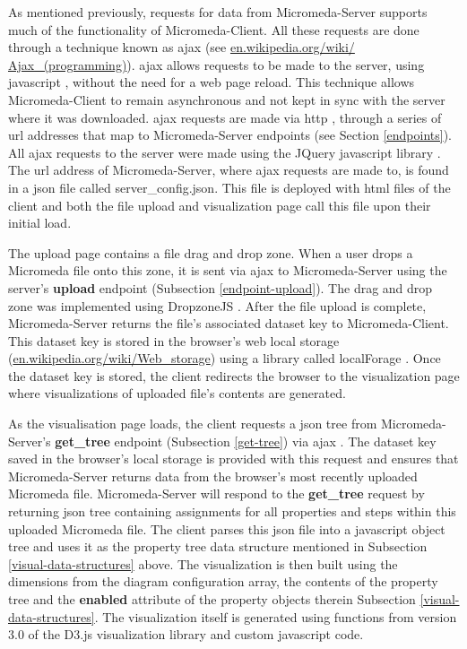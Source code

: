 As mentioned previously, requests for data from Micromeda-Server supports much 
of the functionality of Micromeda-Client. All these requests are done through a 
technique known as \gls{ajax} \cite{garrett2005ajax,li2012jquery} (see 
\href{http://en.wikipedia.org/wiki/Ajax_(programming)}{en.wikipedia.org/wiki/ 
Ajax\_(programming)}). \gls{ajax}  allows requests to be made to the server, 
using \gls{javascript} \cite{flanagan2006javascript}, without the need for a web 
page reload. This technique allows Micromeda-Client to remain asynchronous and 
not kept in sync with the server where it was downloaded. \gls{ajax}  requests 
are made via \gls{http} \cite{fielding1999hypertext}, through a series of 
\gls{url} addresses \cite{berners1994rfc} that map to Micromeda-Server endpoints 
(see Section \ref{endpoints}). All \gls{ajax}  requests to the server were made 
using the JQuery \gls{javascript} library 
\cite{chaffer2013learning,li2012jquery}. The \gls{url} address of 
Micromeda-Server, where \gls{ajax}  requests are made to, is found in a 
\gls{json} file called server\_config.json. This file is deployed with 
\gls{html} files of the client and both the file upload and visualization page 
call this file upon their initial load.

The upload page contains a file drag and drop zone. When a user drops a 
Micromeda file onto this zone, it is sent via \gls{ajax}  to Micromeda-Server 
using the server's \textbf{upload} endpoint (Subsection \ref{endpoint-upload}). 
The drag and drop zone was implemented using DropzoneJS \cite{meno}. After the 
file upload is complete, Micromeda-Server returns the file's associated dataset 
key to Micromeda-Client. This dataset key is stored in the browser's web local 
storage \cite{Hickson} 
(\href{http://en.wikipedia.org/wiki/Web_storage}{en.wikipedia.org/wiki/Web\_storage}) 
using a library called localForage \cite{localforage}. Once the dataset key is 
stored, the client redirects the browser to the visualization page where 
visualizations of uploaded file's contents are generated.

As the visualisation page loads, the client requests a \gls{json} tree from 
Micromeda-Server's \textbf{get\_tree} endpoint (Subsection \ref{get-tree}) via 
\gls{ajax} . The dataset key saved in the browser's local storage is provided 
with this request and ensures that Micromeda-Server returns data from the 
browser's most recently uploaded Micromeda file. Micromeda-Server will respond 
to the \textbf{get\_tree} request by returning \gls{json} tree containing 
assignments for all properties and steps within this uploaded Micromeda file. 
The client parses this \gls{json} file into a \gls{javascript} object tree and 
uses it as the property tree data structure mentioned in Subsection 
\ref{visual-data-structures} above. The visualization is then built using the 
dimensions from the diagram configuration array, the contents of the property 
tree and the \textbf{enabled} attribute of the property objects therein 
Subsection \ref{visual-data-structures}. The visualization itself is generated 
using functions from version 3.0 of the D3.js visualization library 
\cite{bostock2015d3} and custom \gls{javascript} code.

